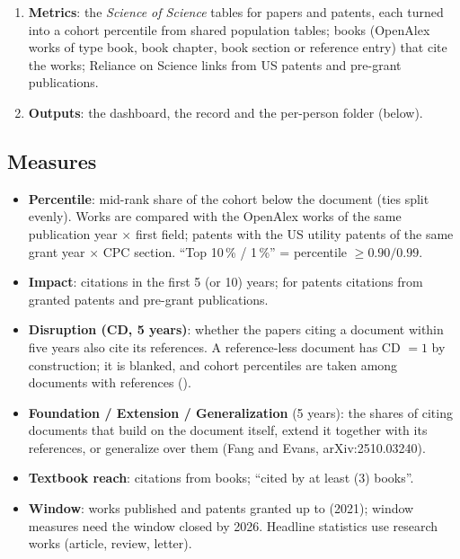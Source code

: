 \documentclass[11pt,a4paper]{article}
\newcommand{\file}[1]{\path{#1}}
\begin{document}
\begin{enumerate}
  crosswalk (PatentsView 2023-03-30 ids, translated to the 2025-12-31 release) and from a PatentsView name search; each
  candidate's patents are clustered by shared co-inventors and assignees and a cluster is linked on evidence from the
  author's own record --- \emph{strong}: a co-inventor who is a co-author with a rare name, a citation of a rarely cited
  work of the author, a small assignee that names a major affiliation; \emph{moderate}: a co-author co-inventor with a
  common name, a citation of a widely cited work, an assignee naming an affiliation, the pqrs link; \emph{conflict}:
  inventor countries outside the affiliation countries, grant years far from the publication years. Common names need
  evidence on at least 10\,\% of a cluster; patents of a selected id that belong to a namesake are left out and listed
  with the reason.
\item \textbf{Metrics}: the \emph{Science of Science} tables for papers and patents, each turned into a cohort
  percentile from shared population tables; books (OpenAlex works of type book, book chapter, book section or
  reference entry) that cite the works; Reliance on Science links from US patents and pre-grant publications.
\item \textbf{Outputs}: the dashboard, the record and the per-person folder (below).
\end{enumerate}

\subsection{Measures}

\begin{itemize}
\item \textbf{Percentile}: mid-rank share of the cohort below the document (ties split evenly). Works are compared
  with the OpenAlex works of the same publication year $\times$ first field; patents with the US utility patents of
  the same grant year $\times$ CPC section. ``Top 10\,\% / 1\,\%'' = percentile $\geq 0.90 / 0.99$.
\item \textbf{Impact}: citations in the first 5 (or 10) years; for patents citations from granted patents and pre-grant
  publications.
\item \textbf{Disruption (CD, 5 years)}: whether the papers citing a document within five years also cite its
  references. A reference-less document has CD $=1$ by construction; it is blanked, and cohort percentiles are taken
  among documents with references (\file{cache/cd_rpctl_*.parquet}).
\item \textbf{Foundation / Extension / Generalization} (5 years): the shares of citing documents that build on the
  document itself, extend it together with its references, or generalize over them (Fang and Evans, arXiv:2510.03240).
\item \textbf{Textbook reach}: citations from books; ``cited by at least  (3) books''.
\item \textbf{Window}: works published and patents granted up to  (2021); window measures need the window
  closed by 2026. Headline statistics use research works (article, review, letter).
\end{itemize}
\end{document}
